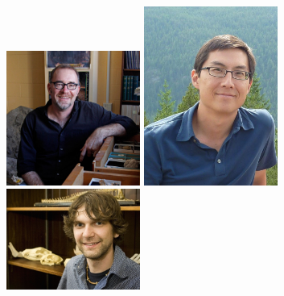 \documentclass{beamer}
\begin{document}
\begin{frame}
\begin{center}
    \includegraphics[width=0.33\textwidth,height=0.4\textheight,keepaspectratio=true]{figure/committee/david_2}
    \includegraphics[width=0.33\textwidth,height=0.4\textheight,keepaspectratio=true]{figure/committee/rick}
    \includegraphics[width=0.33\textwidth,height=0.4\textheight,keepaspectratio=true]{figure/committee/graham}
  \end{center}
\end{frame}
\end{document}
